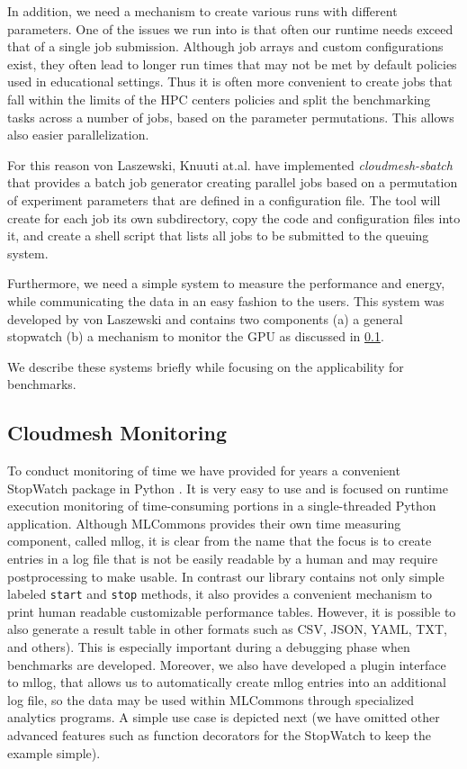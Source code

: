 \documentclass[utf8]{FrontiersinVancouver} %
\begin{document}
{In addition, we need a mechanism to create various runs with different
parameters. One of the issues we run into is that often our runtime
needs exceed that of a single job submission. Although job arrays and
custom configurations exist, they often lead to longer run times that
may not be met by default policies used in educational settings. Thus
it is often more convenient to create jobs that fall within the limits
of the HPC centers policies and split the benchmarking tasks across a
number of jobs, based on the parameter permutations. This allows also
easier parallelization.

For this reason von Laszewski, Knuuti at.al. have implemented {\it
  cloudmesh-sbatch} that provides a batch job generator creating
parallel jobs based on a permutation of experiment parameters that are
defined in a configuration file. The tool will create for each job its
own subdirectory, copy the code and configuration files into it, and
create a shell script that lists all jobs to be submitted to the
queuing system.

Furthermore, we need a simple system to measure the performance and
energy, while communicating the data in an easy fashion to the
users. This system was developed by von Laszewski and contains two
components (a) a general stopwatch (b) a mechanism to monitor the GPU
as discussed in \ref{sec:monitoring}.

We describe these systems briefly while focusing on the applicability
for benchmarks.

\subsection{Cloudmesh Monitoring}
\label{sec:monitoring}

To conduct monitoring of time we have provided for years a convenient
StopWatch package in Python \citep{cloudmesh-stopwatch}.  It is very
easy to use and is focused on runtime execution monitoring of
time-consuming portions in a single-threaded Python
application. Although MLCommons provides their own time measuring
component, called mllog, it is clear from the name that the focus is
to create entries in a log file that is not be easily readable by a
human and may require postprocessing to make usable. In contrast our
library contains not only simple labeled \verb|start| and \verb|stop|
methods, it also provides a convenient mechanism to print human
readable customizable performance tables. However, it is possible to
also generate a result table in other formats such as CSV, JSON, YAML,
TXT, and others).  This is especially important during a debugging
phase when benchmarks are developed. Moreover, we also have developed
a plugin interface to mllog, that allows us to automatically create
mllog entries into an additional log file, so the data may be used
within MLCommons through specialized analytics programs. A simple use
case is depicted next (we have omitted other advanced features such as
function decorators for the StopWatch to keep the example simple).

}
\end{document}
